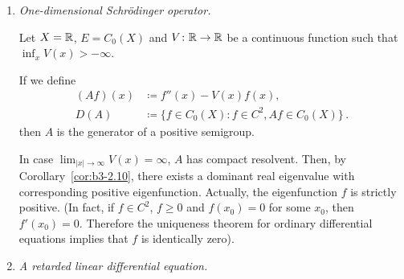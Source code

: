 \begin{example}\label{ex:b3-2.14}
%


\begin{enumerate}[\upshape (i), wide, labelindent=.5em]
	\item \emph{One-dimensional Schrödinger operator.}

	Let $X = \mathbb{R}$, $E = C_{0}(X)$ and $V \colon \mathbb{R} \to \mathbb{R}$ be a continuous function such that $\inf_{x} V(x) > -\infty$.
	
	If we define
	\begin{equation}\label{eq:b3-2.22}
		\begin{aligned}
			(Af)(x) &\coloneqq f''(x) - V(x)f(x), \\
			D(A) &\coloneqq \{f \in C_{0}(X) \colon f \in C^{2}, Af \in C_{0}(X)\}\,.
		\end{aligned}
	\end{equation}
	then $A$ is the generator of a positive semigroup.
	
	In case $\lim_{|x| \to \infty}V(x) = \infty$, $A$ has compact resolvent.
	Then, by Corollary~\ref{cor:b3-2.10}, there exists a dominant real eigenvalue with corresponding positive eigenfunction.
	Actually, the eigenfunction $f$ is strictly positive. 
    (In fact, if $f \in C^{2}$, $f \geq 0$ and $f(x_{0}) = 0$ for some $x_{0}$, then $f'(x_{0}) = 0$.
	Therefore the uniqueness theorem for ordinary differential equations implies that $f$ is identically zero).
	
\item \emph{A retarded linear differential equation.} 	


\end{enumerate}
\end{example}
